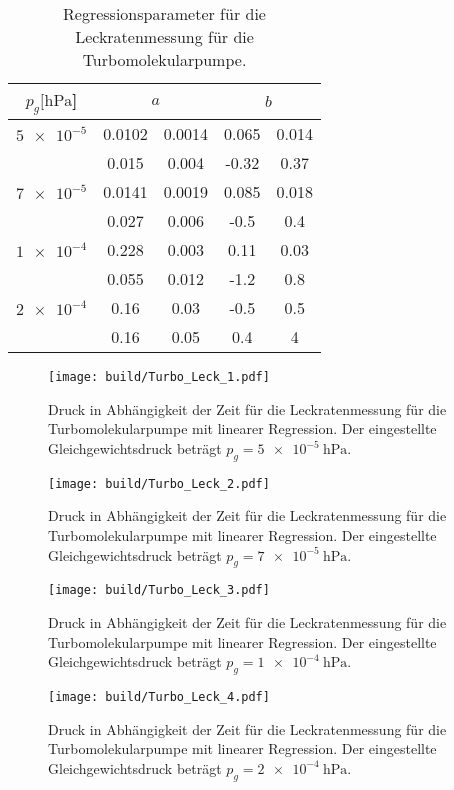 \begin{table}[H]
    \centering
      \caption{Regressionsparameter für die Leckratenmessung für die Turbomolekularpumpe.}
      \label{tab:Turbo_Leck_para}
      \begin{tabular}{c c @{${}\pm{}$} c c @{${}\pm{}$} c}
        \toprule
        {$p_g [\si{\hecto\pascal}$]} & \multicolumn{2}{c}{$a$} & \multicolumn{2}{c}{$b$} \\
        \midrule
        $\num{5e-5}$  & 0.0102 & 0.0014 & 0.065 & 0.014\\
                      & 0.015  & 0.004  & -0.32 & 0.37 \\
        \midrule
        $\num{7e-5}$  & 0.0141 & 0.0019 & 0.085 & 0.018\\
                      & 0.027  & 0.006  & -0.5  & 0.4  \\
        \midrule
        $\num{1e-4}$  & 0.228  & 0.003  & 0.11  & 0.03 \\
                      & 0.055  & 0.012  & -1.2  & 0.8  \\
        \midrule
        $\num{2e-4}$  & 0.16   & 0.03   & -0.5  & 0.5  \\
                      & 0.16   & 0.05   & 0.4   & 4    \\

        \bottomrule
      \end{tabular}
\end{table}

\begin{figure}[H]
    \centering
    \texttt{[image: build/Turbo\_Leck\_1.pdf]}
    \caption{Druck in Abhängigkeit der Zeit für die Leckratenmessung für die Turbomolekularpumpe mit linearer Regression. Der eingestellte Gleichgewichtsdruck beträgt $p_g=\SI{5e-5}{\hecto\pascal}$.}
    \label{fig:turbo_leck1}
\end{figure}
\noindent
\begin{figure}[H]
    \centering
    \texttt{[image: build/Turbo\_Leck\_2.pdf]}
    \caption{Druck in Abhängigkeit der Zeit für die Leckratenmessung für die Turbomolekularpumpe mit linearer Regression. Der eingestellte Gleichgewichtsdruck beträgt $p_g=\SI{7e-5}{\hecto\pascal}$.}
    \label{fig:turbo_leck2}
\end{figure}
\noindent
\begin{figure}[H]
    \centering
    \texttt{[image: build/Turbo\_Leck\_3.pdf]}
    \caption{Druck in Abhängigkeit der Zeit für die Leckratenmessung für die Turbomolekularpumpe mit linearer Regression. Der eingestellte Gleichgewichtsdruck beträgt $p_g=\SI{1e-4}{\hecto\pascal}$.}
    \label{fig:turbo_leck3}
\end{figure}
\noindent
\begin{figure}[H]
    \centering
    \texttt{[image: build/Turbo\_Leck\_4.pdf]}
    \caption{Druck in Abhängigkeit der Zeit für die Leckratenmessung für die Turbomolekularpumpe mit linearer Regression. Der eingestellte Gleichgewichtsdruck beträgt $p_g=\SI{2e-4}{\hecto\pascal}$.}
    \label{fig:turbo_leck4}
\end{figure}
\noindent